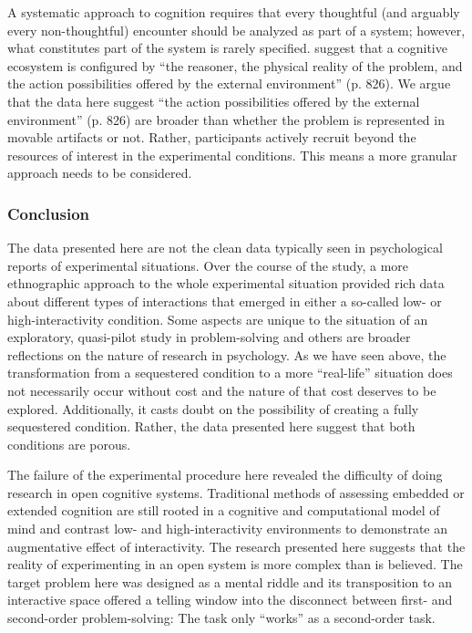 \documentclass[twocolumn, issue, empirical, authordate,drafn]{jote-new-article}
\begin{document}
A systematic approach to cognition requires that every thoughtful (and arguably every non-thoughtful) encounter should be analyzed as part of a system; however, what constitutes part of the system is rarely specified. \textcite{Vallee-Tourangeau2020} suggest that a cognitive ecosystem is configured by ``the reasoner, the physical reality of the problem, and the action possibilities offered by the external environment'' (p. 826). We argue that the data here suggest ``the action possibilities offered by the external environment'' (p. 826) are broader than whether the problem is represented in movable artifacts or not. Rather, participants actively recruit beyond the resources of interest in the experimental conditions. This means a more granular approach needs to be considered. 


\subsubsection{Conclusion}

The data presented here are not the clean data typically seen in psychological reports of experimental situations. Over the course of the study, a more ethnographic approach to the whole experimental situation provided rich data about different types of interactions that emerged in either a so-called low- or high-interactivity condition. Some aspects are unique to the situation of an exploratory, quasi-pilot study in problem-solving and others are broader reflections on the nature of research in psychology. As we have seen above, the transformation from a sequestered condition to a more ``real-life'' situation does not necessarily occur without cost and the nature of that cost deserves to be explored. Additionally, it casts doubt on the possibility of creating a fully sequestered condition. Rather, the data presented here suggest that both conditions are porous. 

The failure of the experimental procedure here revealed the difficulty of doing research in open cognitive systems. Traditional methods of assessing embedded or extended cognition are still rooted in a cognitive and computational model of mind and contrast low- and high-interactivity environments to demonstrate an augmentative effect of interactivity. The research presented here suggests that the reality of experimenting in an open system is more complex than is believed. The target problem here was designed as a mental riddle and its transposition to an interactive space offered a telling window into the disconnect between first- and second-order problem-solving: The task only ``works'' as a second-order task. 
\end{document}
